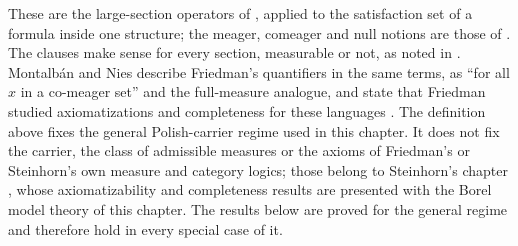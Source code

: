 These are the large-section operators of
\cite[\S2.4, pp.~7--8]{MioSkrzypczakMichalewski2018}, applied to the
satisfaction set of a formula inside one structure; the meager,
comeager and null notions are those of
\cite[\S2.2, p.~5 and \S2.3, p.~6]{MioSkrzypczakMichalewski2018}.
The clauses make sense for every section, measurable or not, as noted in
\cite[Remark~2.7, p.~8]{MioSkrzypczakMichalewski2018}.
Montalb\'an and Nies describe Friedman's quantifiers in the same
terms, as ``for all \(x\) in a co-meager set'' and the full-measure
analogue, and state that Friedman studied axiomatizations and
completeness for these languages
\cite[p.~2]{MontalbanNiesBorelSurvey}. The definition above fixes the
general Polish-carrier regime used in this chapter. It does not fix the
carrier, the class of admissible measures or the axioms of Friedman's
or Steinhorn's own measure and category logics; those belong to
Steinhorn's chapter \cite[ch.~XVI, from p.~579]{Steinhorn1985BorelMeasureCategory},
whose axiomatizability and completeness results are presented with the
Borel model theory of this chapter. The results below are proved for
the general regime and therefore hold in every special case of it.

